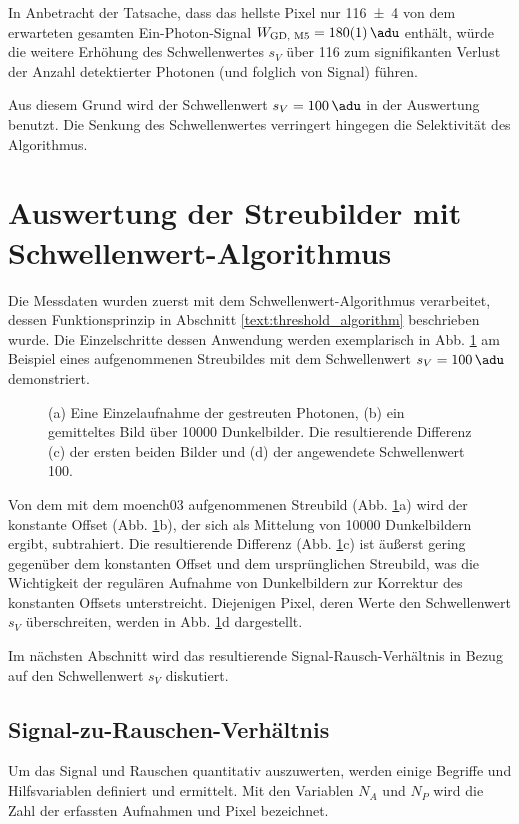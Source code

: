 \noindent
In Anbetracht der Tatsache, dass das hellste Pixel nur \SI{116(4)}{\adu} von dem erwarteten gesamten Ein-Photon-Signal $W_\text{GD, M5} = \SI{180(1)}{\adu}$ enthält, würde die weitere Erhöhung des Schwellenwertes $s_V$ über \SI{116}{\adu} zum signifikanten Verlust der Anzahl detektierter Photonen (und folglich von Signal) führen.

\noindent
Aus diesem Grund wird der Schwellenwert $s_V = \SI{100}{\adu}$ in der Auswertung benutzt. Die Senkung des Schwellenwertes verringert hingegen die Selektivität des Algorithmus.

\section{Auswertung der Streubilder mit Schwellenwert-Algorithmus}
\label{text:streuung_counting}
Die Messdaten wurden zuerst mit dem Schwellenwert-Algorithmus verarbeitet, dessen Funktionsprinzip in Abschnitt \ref{text:threshold_algorithm} beschrieben wurde. Die Einzelschritte dessen Anwendung werden exemplarisch in Abb. \ref{fig:capture_ped_diff} am Beispiel eines aufgenommenen Streubildes mit dem Schwellenwert $s_V = \SI{100}{\adu}$ demonstriert.
\begin{figure}[H]
    \centering
    
    \caption{(a) Eine Einzelaufnahme der gestreuten Photonen, (b) ein gemitteltes Bild über \num{10000} Dunkelbilder.  Die resultierende Differenz (c) der ersten beiden Bilder und (d) der angewendete Schwellenwert \SI{100}{\adu}.}
    \label{fig:capture_ped_diff}
\end{figure}
\noindent
Von dem mit dem \gls{moench03} aufgenommenen Streubild (Abb. \ref{fig:capture_ped_diff}a) wird der konstante Offset (Abb. \ref{fig:capture_ped_diff}b), der sich als Mittelung von \num{10000} Dunkelbildern ergibt, subtrahiert. Die resultierende Differenz (Abb. \ref{fig:capture_ped_diff}c) ist äußerst gering gegenüber dem konstanten Offset und dem ursprünglichen Streubild, was die Wichtigkeit der regulären Aufnahme von Dunkelbildern zur Korrektur des konstanten Offsets unterstreicht. Diejenigen Pixel, deren Werte den Schwellenwert $s_V$ überschreiten, werden in Abb. \ref{fig:capture_ped_diff}d dargestellt.

\noindent
Im nächsten Abschnitt wird das resultierende Signal-Rausch-Verhältnis in Bezug auf den Schwellenwert $s_V$ diskutiert.

\subsection{Signal-zu-Rauschen-Verhältnis}
Um das Signal und Rauschen quantitativ auszuwerten, werden einige Begriffe und Hilfsvariablen definiert und ermittelt. Mit den Variablen $N_A$ und $N_P$ wird die Zahl der erfassten Aufnahmen und Pixel bezeichnet.

